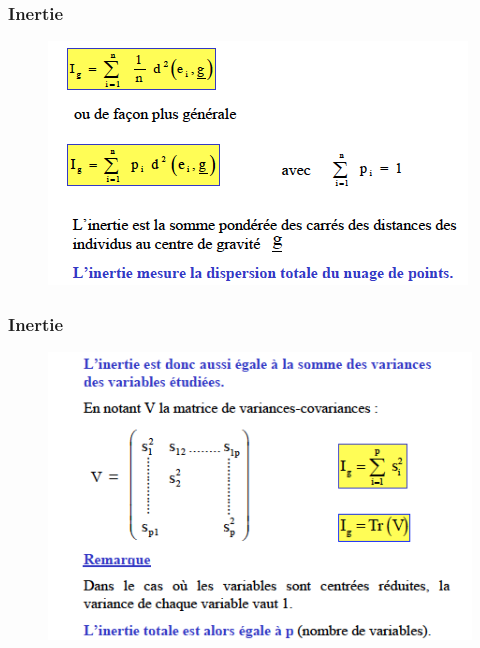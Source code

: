 \documentclass[11pt]{beamer}
\begin{document}
\begin{frame}
\frametitle{Inertie}
\begin{figure}
\includegraphics[scale=0.6]{schema10.png} 
\end{figure}

\end{frame}

\begin{frame}
\frametitle{Inertie}
\begin{figure}
\includegraphics[scale=0.6]{schema11.png} 
\end{figure}

\end{frame}
\end{document}
